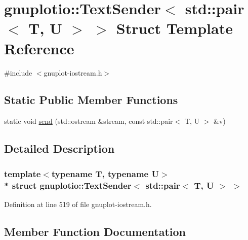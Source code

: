\hypertarget{structgnuplotio_1_1_text_sender_3_01std_1_1pair_3_01_t_00_01_u_01_4_01_4}{}\section{gnuplotio\+:\+:Text\+Sender$<$ std\+:\+:pair$<$ T, U $>$ $>$ Struct Template Reference}
\label{structgnuplotio_1_1_text_sender_3_01std_1_1pair_3_01_t_00_01_u_01_4_01_4}


{\ttfamily \#include $<$gnuplot-\/iostream.\+h$>$}

\subsection*{Static Public Member Functions}
\begin{DoxyCompactItemize}
\item 
static void \hyperlink{structgnuplotio_1_1_text_sender_3_01std_1_1pair_3_01_t_00_01_u_01_4_01_4_ae1f3a6ffd8a60bb73d787578327154d1}{send} (std\+::ostream \&stream, const std\+::pair$<$ T, U $>$ \&v)
\end{DoxyCompactItemize}


\subsection{Detailed Description}
\subsubsection*{template$<$typename T, typename U$>$\\*
struct gnuplotio\+::\+Text\+Sender$<$ std\+::pair$<$ T, U $>$ $>$}



Definition at line 519 of file gnuplot-\/iostream.\+h.



\subsection{Member Function Documentation}
